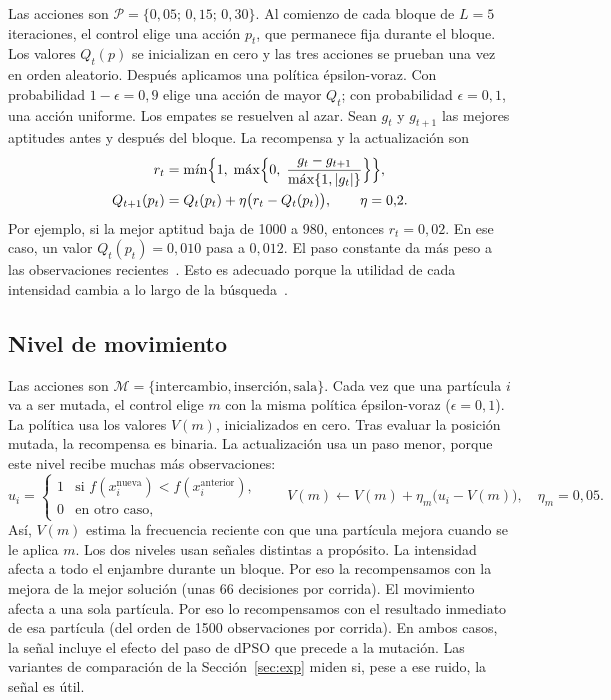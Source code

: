 \documentclass[10pt,a4paper]{article}
\DeclareMathOperator*{\maxop}{m\acute{a}x}
\DeclareMathOperator*{\minop}{m\acute{\imath}n}
\newcommand{\dc}{{,}}%
\begin{document}
Las acciones son $\mathcal{P}=\{0\dc05;\,0\dc15;\,0\dc30\}$. Al comienzo de cada bloque de $L=5$
iteraciones, el control elige una acción $p_t$, que permanece fija durante el bloque. Los
valores $Q_t(p)$ se inicializan en cero y las tres acciones se prueban una vez en orden
aleatorio. Después aplicamos una política épsilon-voraz. Con probabilidad $1-\epsilon=0\dc9$
elige una acción de mayor $Q_t$; con probabilidad $\epsilon=0\dc1$, una acción uniforme. Los
empates se resuelven al azar. Sean $g_t$ y $g_{t+1}$ las mejores aptitudes antes y después del
bloque. La recompensa y la actualización son
\begin{align}
r_t &= \minop\Bigl\{1,\;\maxop\Bigl\{0,\;\frac{g_t-g_{t+1}}{\maxop\{1,|g_t|\}}\Bigr\}\Bigr\},
\label{eq:r}\\
Q_{t+1}(p_t) &= Q_t(p_t)+\eta\bigl(r_t-Q_t(p_t)\bigr),\qquad \eta=0\dc2 .
\label{eq:q}
\end{align}
Por ejemplo, si la mejor aptitud baja de 1000 a 980, entonces $r_t=0\dc02$. En ese caso, un
valor $Q_t(p_t)=0\dc010$ pasa a $0\dc012$. El paso constante da más peso a las observaciones
recientes~\cite{sutton2018}. Esto es adecuado porque la utilidad de cada intensidad cambia a lo
largo de la búsqueda~\cite{fialho2010}.

\subsection{Nivel de movimiento}

Las acciones son $\mathcal{M}=\{\text{intercambio},\text{inserción},\text{sala}\}$. Cada vez que
una partícula $i$ va a ser mutada, el control elige $m$ con la misma política épsilon-voraz
($\epsilon=0\dc1$). La política usa los valores $V(m)$, inicializados en cero. Tras evaluar la
posición mutada, la recompensa es binaria. La actualización usa un paso menor, porque este
nivel recibe muchas más observaciones:
\begin{equation}
u_i=\begin{cases}1 & \text{si } f(x_i^{\text{nueva}})<f(x_i^{\text{anterior}}),\\ 0 & \text{en otro caso,}\end{cases}
\qquad V(m)\leftarrow V(m)+\eta_m\bigl(u_i-V(m)\bigr),\quad \eta_m=0\dc05 .
\label{eq:v}
\end{equation}
Así, $V(m)$ estima la frecuencia reciente con que una partícula mejora cuando se le aplica $m$.
Los dos niveles usan señales distintas a propósito. La intensidad afecta a todo el enjambre
durante un bloque. Por eso la recompensamos con la mejora de la mejor solución (unas 66
decisiones por corrida). El movimiento afecta a una sola partícula. Por eso lo recompensamos
con el resultado inmediato de esa partícula (del orden de 1500 observaciones por corrida). En
ambos casos, la señal incluye el efecto del paso de dPSO que precede a la mutación. Las
variantes de comparación de la Sección~\ref{sec:exp} miden si, pese a ese ruido, la señal es
útil.
\end{document}
